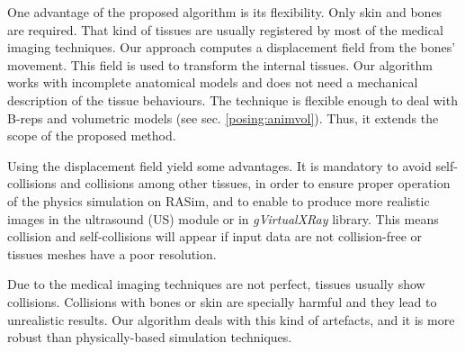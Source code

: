 One advantage of the proposed algorithm is its flexibility. Only skin and bones are required. That kind of tissues are usually registered by most of the medical imaging techniques. Our approach computes a displacement field from the bones' movement. This field is used to transform the internal tissues. Our algorithm works with incomplete anatomical models and does not need a mechanical description of the tissue behaviours. The technique is flexible enough to deal with \acs{B-rep}s and volumetric models (see sec. \ref{posing:animvol}). Thus, it extends the scope of the proposed method.


Using the displacement field yield some advantages. It is mandatory to avoid self-collisions and collisions among other tissues, in order to ensure proper operation of the physics simulation on \acs{RASim}, and to enable to produce more realistic images in the ultrasound (US) module or in \emph{gVirtualXRay} library. This means collision and self-collisions will appear if input data are not collision-free or tissues meshes have a poor resolution. 

Due to the medical imaging techniques are not perfect, tissues usually show collisions. Collisions with bones or skin are specially harmful and they lead to unrealistic results. Our algorithm deals with this kind of artefacts, and it is more robust than physically-based simulation techniques.


